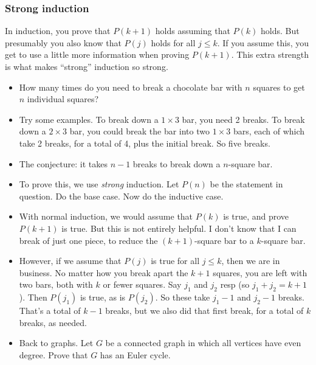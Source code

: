 \documentclass[12pt]{article}
\theoremstyle{plain}
\theoremstyle{definition}
\theoremstyle{remark}
\begin{document}
\subsubsection*{Strong induction}

In induction, you prove that $P(k+1)$ holds assuming that $P(k)$ holds.  But presumably you also know that $P(j)$ holds for all $j \le k$.  If you assume this, you get to use a little more information when proving $P(k+1)$.  This extra strength is what makes ``strong'' induction so strong.

\begin{itemize}

	\item How many times do you need to break a chocolate bar with $n$ squares to get $n$ individual squares?

	\item Try some examples.  To break down a $1\times 3$ bar, you need 2 breaks.  To break down a $2\times 3$ bar, you could break the bar into two $1\times 3$ bars, each of which take 2 breaks, for a total of 4, plus the initial break.  So five breaks.

  \item The conjecture: it takes $n-1$ breaks to break down a $n$-square bar.

  \item To prove this, we use \emph{strong} induction.  Let $P(n)$ be the statement in question.  Do the base case.  Now do the inductive case.

  \item With normal induction, we would assume that $P(k)$ is true, and prove $P(k+1)$ is true.  But this is not entirely helpful.  I don't know that I can break of just one piece, to reduce the $(k+1)$-square bar to a $k$-square bar.

  \item However, if we assume that $P(j)$ is true for all $j \le k$, then we are in business.  No matter how you break apart the $k+1$ squares, you are left with two bars, both with $k$ or fewer squares.  Say $j_1$ and $j_2$ resp (so $j_1 + j_2 = k+1$).  Then $P(j_1)$ is true, as is $P(j_2)$.  So these take $j_1 - 1$ and $j_2 - 1$ breaks.  That's a total of $k-1$ breaks, but we also did that first break, for a total of $k$ breaks, as needed.

  \item Back to graphs.  Let $G$ be a connected graph in which all vertices have even degree.  Prove that $G$ has an Euler cycle.


\end{itemize}
\end{document}
